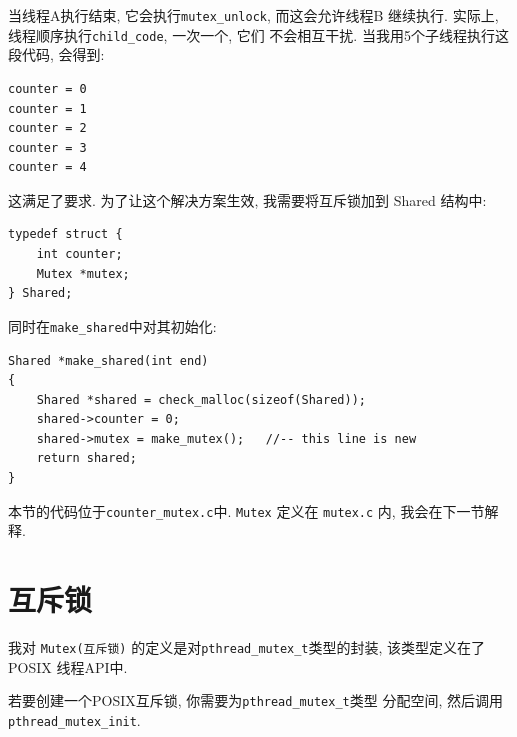 \documentclass[12pt]{book}
\begin{document}
{%
当线程A执行结束, 它会执行\verb"mutex_unlock", 而这会允许线程B
继续执行. 实际上, 线程顺序执行\verb"child_code", 一次一个, 它们
不会相互干扰. 当我用5个子线程执行这段代码, 会得到: 

\begin{verbatim}
counter = 0
counter = 1
counter = 2
counter = 3
counter = 4
\end{verbatim}

这满足了要求. 为了让这个解决方案生效, 我需要将互斥锁加到
Shared 结构中: 

\begin{verbatim}
typedef struct {
    int counter;
    Mutex *mutex;
} Shared;
\end{verbatim}

同时在\verb"make_shared"中对其初始化: 


\begin{verbatim}
Shared *make_shared(int end)
{
    Shared *shared = check_malloc(sizeof(Shared));
    shared->counter = 0;
    shared->mutex = make_mutex();   //-- this line is new
    return shared;
}
\end{verbatim}

本节的代码位于\verb"counter_mutex.c"中.  {\tt Mutex} 定义在
{\tt mutex.c} 内, 我会在下一节解释.


\section{互斥锁}


我对 {\tt Mutex(互斥锁)} 的定义是对\verb"pthread_mutex_t"类型的封装,
该类型定义在了POSIX 线程API中.

若要创建一个POSIX互斥锁, 你需要为\verb"pthread_mutex_t"类型
分配空间, 然后调用 \verb"pthread_mutex_init".

}
\end{document}
